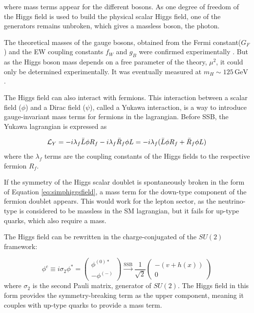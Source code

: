 where mass terms appear for the different bosons. As one degree of freedom of the Higgs field is used to build the physical scalar Higgs field, one of the generators remains unbroken, which gives a massless boson, the photon.

The theoretical masses of the gauge bosons, obtained from the Fermi constant($G_F$) and the EW coupling constants $f_W$ and $g_B$ were confirmed experimentally \cite{ARNISON1983103,BANNER1983476,1983398,BAGNAIA1983130,Group:2008ds}. But as the Higgs boson mass depends on a free parameter of the theory, $\mu^2$, it could only be determined experimentally. It was eventually measured at $m_H \sim 125\,{\mathrm{GeV}}$ \cite{Aad2016}.\newline

The Higgs field can also interact with fermions. This interaction between a scalar field ($\phi$) and a Dirac field ($\psi$), called a Yukawa interaction, is a way to introduce gauge-invariant mass terms for fermions in the lagrangian. Before SSB, the Yukawa lagrangian is expressed as 

\begin{equation}
    \mathcal{L}_{Y} = -i\lambda_f \Bar{L} \phi R_f - i\lambda_f\Bar{R}_f \phi L = -i\lambda_f (\Bar{L}\phi R_f + \Bar{R}_f \phi L)
\end{equation}
where the $\lambda_f$ terms are the coupling constants of the Higgs fields to the respective fermion $R_f$.

If the symmetry of the Higgs scalar doublet is spontaneously broken in the form of Equation \ref{eq:simphiggsfield}, a mass term for the down-type component of the fermion doublet appears. This would work for the lepton sector, as the neutrino-type is considered to be massless in the SM lagrangian, but it fails for up-type quarks, which also require a mass.

The Higgs field can be rewritten in the charge-conjugated of the $SU(2)$ framework:

\begin{equation}
    \phi^c \equiv i\sigma_2 \phi^* = \begin{pmatrix} \phi^{(0)*} \\ -\phi^{(-)} \end{pmatrix}  \xrightarrow{\text{SSB}} \frac{1}{\sqrt{2}}\begin{pmatrix} -(v+h(x)) \\ 0 \end{pmatrix} 
\end{equation}
where $\sigma_2$ is the second Pauli matrix, generator of $SU(2)$. The Higgs field in this form provides the symmetry-breaking term as the upper component, meaning it couples with up-type quarks to provide a mass term.

